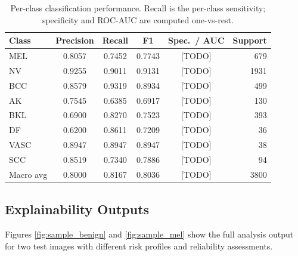 \begin{table}[t]
    \centering
    \caption{Per-class classification performance. Recall is the per-class
        sensitivity; specificity and ROC-AUC are computed one-vs-rest.}
    \label{tab:perclass}
    \begin{tabular}{lccccr}
        \toprule
        Class     & Precision & Recall & F1     & Spec.\ / AUC & Support \\
        \midrule
        MEL       & 0.8057    & 0.7452 & 0.7743 & [TODO]       & 679     \\
        NV        & 0.9255    & 0.9011 & 0.9131 & [TODO]       & 1931    \\
        BCC       & 0.8579    & 0.9319 & 0.8934 & [TODO]       & 499     \\
        AK        & 0.7545    & 0.6385 & 0.6917 & [TODO]       & 130     \\
        BKL       & 0.6900    & 0.8270 & 0.7523 & [TODO]       & 393     \\
        DF        & 0.6200    & 0.8611 & 0.7209 & [TODO]       & 36      \\
        VASC      & 0.8947    & 0.8947 & 0.8947 & [TODO]       & 38      \\
        SCC       & 0.8519    & 0.7340 & 0.7886 & [TODO]       & 94      \\
        \midrule
        Macro avg & 0.8000    & 0.8167 & 0.8036 & [TODO]       & 3800    \\
        \bottomrule
    \end{tabular}
\end{table}

\subsection{Explainability Outputs}

Figures \ref{fig:sample_benign} and \ref{fig:sample_mel} show the full analysis
output for two test images with different risk profiles and reliability
assessments.

